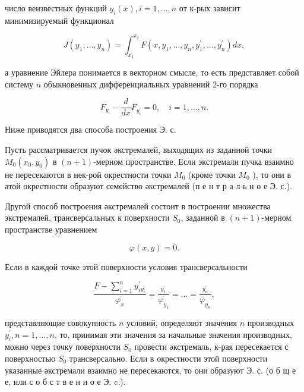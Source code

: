 \documentclass[10pt]{article}
\begin{document}
число веизвестных функций $y_{i}(x), i=1, \ldots, n$ от к-рых зависит минимизируемый функционал



\[

J\left(y_{1}, \ldots, y_{n}\right)=\int_{x_{1}}^{x_{2}} F\left(x, y_{1}, \ldots, y_{n}, y_{1}^{\prime}, \ldots, y_{n}^{\prime}\right) d x,

\]



а уравнение Эйлера понимается в векторном смысле, то есть представляет собой систему $n$ обыкновенных дифференциальных уравнений 2-го порядка



\[

F_{y_{i}}-\frac{d}{d x} F_{y_{i}^{\prime}}=0, \quad i=1, \ldots, n .

\]



Ниже приводятся два способа построения Э. с.



Пусть рассматривается пучок әкстремалей, выходящих из заданной точки $M_{0}\left(x_{0}, y_{0}\right)$ в $(n+1)$-мерном пространстве. Если экстремали пучка взаимно не пересекаются в нек-рой окрестности точки $M_{0}$ (кроме точки $M_{0}$ ), то они в әтой окрестности образуют семейство әкстремалей (п е н т р а л ь н о е Э. с.).



Другой способ построения әкстремалей состоит в построении множества экстремалей, трансверсальных к поверхности $S_{0}$, заданной в $(n+1)$-мерном пространстве уравнением



\[

\varphi(x, y)=0 .

\]



Если в каждой точке этой поверхности условия трансверсальности



\[

\frac{F-\sum_{i=1}^{n} y_{i}^{\prime}{ }_{y_{i}^{\prime}}}{\varphi_{x}}=\frac{{ }_{y_{1}^{\prime}}}{\varphi_{y_{1}}}=\ldots=\frac{{ }_{y_{n}^{\prime}}}{\varphi_{y_{n}}},

\]



представляющие совокупность $n$ условий, определяют значения $n$ производных $y_{i}^{\prime}, n=1, \ldots, n$, то, принимая эти значения за начальные значения производных, можно через точку поверхности $S_{0}$ провести әкстремаль, к-рая пересекается с поверхностью $S_{0}$ трансверсально. Если в окрестности этой поверхности указанные әкстремали взаимно не пересекаются, то они образуют Э. с. (о б щ е е, или с о б с т в е н н о е Э. c.).
\end{document}
